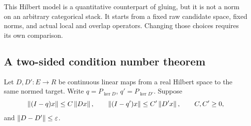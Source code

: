 This Hilbert model is a quantitative counterpart of gluing, but it is not a norm on an arbitrary categorical stack. It starts from a fixed raw candidate space, fixed norms, and actual local and overlap operators. Changing those choices requires its own comparison.

\label{sec:motion}
\subsection{A two-sided condition number theorem}
Let \(D,D':E\to R\) be continuous linear maps from a real Hilbert space to the same normed target. Write \(q=P_{\ker D}\), \(q'=P_{\ker D'}\). Suppose
\[
 \left\lVert(I-q)x\right\rVert\le C\left\lVert Dx\right\rVert,\qquad
 \left\lVert(I-q')x\right\rVert\le C'\left\lVert D'x\right\rVert,\qquad C,C'\ge0,
\]
and \(\left\lVert D-D'\right\rVert\le\varepsilon\).


